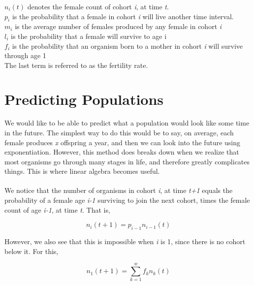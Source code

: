\documentclass{article}
\begin{document}
\noindent
$ n_{i}(t) $ denotes the female count of cohort \textit{i}, at time \textit{t}. \\
$ p_i $ is the probability that a female in cohort \textit{i} will live another time interval. \\
$ m_i $ is the average number of females produced by any female in cohort \textit{i} \\
$ l_i $ is the probability that a female will survive to age i \\
$ f_i $ is the probability that an organism born to a mother in cohort \textit{i} will survive through age 1 \\

The last term is referred to as the fertility rate.

\section{Predicting Populations}
\paragraph{}
We would like to be able to predict what a population would look like some time in the future. The simplest way to do this would be to say, on average, each female produces \textit{x} offspring a year, and then we can look into the future using exponentiation. However, this method does breaks down when we realize that most organisms go through many stages in life, and therefore greatly complicates things. This is where linear algebra becomes useful.

\paragraph{}
We notice that the number of organisms in cohort \textit{i}, at time \textit{t+1} equals the probability of a female age \textit{i-1} surviving to join the next cohort, times the female count of age \textit{i-1}, at time \textit{t}. That is,

\begin{equation}
n_i(t+1)=p_{i-1}n_{i-1}(t)
\end{equation}

However, we also see that this is impossible when \textit{i} is 1, since there is no cohort below it. For this,

\begin{equation}
n_1(t+1)=\displaystyle\sum_{k=1}^{w} f_kn_k(t)
\end{equation}
\end{document}
